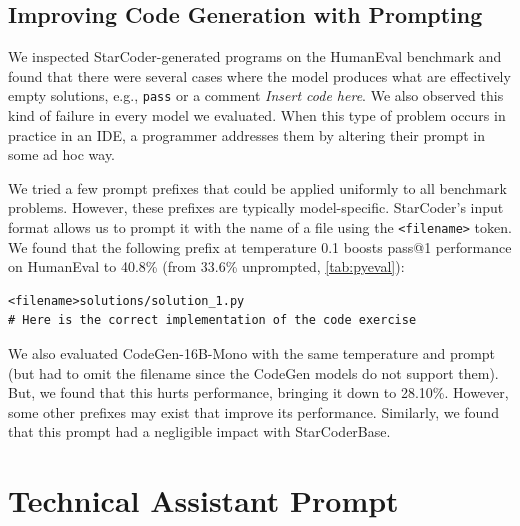 \documentclass[10pt]{article} %
\begin{document}
\subsection{Improving Code Generation with Prompting}\label{sec:prompting}
We inspected StarCoder-generated programs on the HumanEval benchmark and found that there were several cases where the model produces what are effectively empty solutions, e.g., \texttt{pass} or a comment \emph{Insert code here}. We also observed this kind of failure in every model we evaluated. When this type of problem occurs in practice in an IDE, a programmer addresses them by altering their prompt in some ad hoc way.

We tried a few prompt prefixes that could be applied uniformly to all benchmark problems. However, these prefixes are typically model-specific. StarCoder's input format allows us to prompt it with the name of a file using the \texttt{<filename>} token. We found that the following prefix at temperature 0.1 boosts pass@1 performance on HumanEval to 40.8\% (from 33.6\% unprompted, \autoref{tab:pyeval}):
\begin{verbatim}
<filename>solutions/solution_1.py
# Here is the correct implementation of the code exercise
\end{verbatim}
We also evaluated CodeGen-16B-Mono with the same temperature and prompt (but had to omit the filename since the CodeGen models do not support them). But, we found that this hurts performance, bringing it down to 
28.10\%. However, some other prefixes may exist that improve its performance. Similarly, we found that this prompt had a negligible impact with StarCoderBase.

\clearpage
\section{Technical Assistant Prompt}\label{app:prompt}
\end{document}
